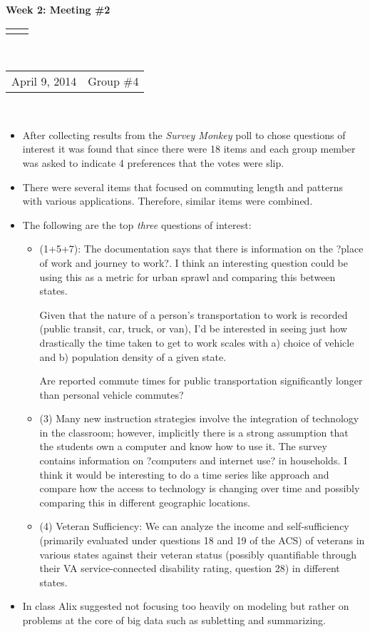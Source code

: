 \documentclass[12pt]{article}
\renewcommand{\title}[1]{\textbf{#1}\\}
\renewcommand{\line}{\begin{tabularx}{\textwidth}{X>{\raggedleft}X}\hline\\\end{tabularx}\\[-0.5cm]}
\newcommand{\leftright}[2]{\begin{tabularx}{\textwidth}{X>{\raggedleft}X}#1%
& #2\\\end{tabularx}\\[-0.5cm]}
\begin{document}
\title{Week 2: Meeting \#2 }
\line
\leftright{April 9, 2014}{Group \#4} %
\vspace{5mm}

\begin{itemize}
\item After collecting results from the \emph{Survey Monkey} poll to chose questions of interest it was found that since there were 18 items and each group member was asked to indicate 4 preferences that the votes were slip. 
\item There were several items that focused on commuting length and patterns with various applications.  Therefore, similar items were combined. 
\item The following are the top \emph{three} questions of interest:
\begin{itemize}
\item (1+5+7): The documentation says that there is information on the ?place of work and journey to work?. I think an interesting question could be using this as a metric for urban sprawl and comparing this between states. 

Given that the nature of a person's transportation to work is recorded (public transit, car, truck, or van), I'd be interested in seeing just how drastically the time taken to get to work scales with a) choice of vehicle and b) population density of a given state.

Are reported commute times for public transportation significantly longer than personal vehicle commutes?
\item (3) Many new instruction strategies involve the integration of technology in the classroom; however, implicitly there is a strong assumption that the students own a computer and know how to use it. The survey contains information on ?computers and internet use? in households. I think it would be interesting to do a time series like approach and compare how the access to technology is changing over time and possibly comparing this in different geographic locations. 
\item (4) Veteran Sufficiency: We can analyze the income and self-sufficiency (primarily evaluated under questions 18 and 19 of the ACS) of veterans in various states against their veteran status (possibly quantifiable through their VA service-connected disability rating, question 28) in different states.
\end{itemize}
\item In class Alix suggested not focusing too heavily on modeling but rather on problems at the core of big data such as subletting and summarizing. 
\end{itemize}
\end{document}
